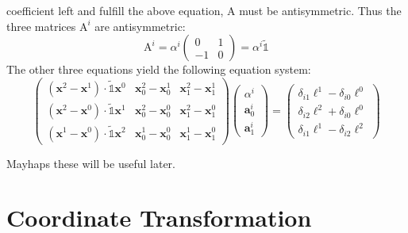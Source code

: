 \documentclass{scrartcl}
\begin{document}
coefficient left and fulfill the above equation, $\mathrm A$ must be
antisymmetric.  Thus the three matrices $\mathrm A^i$ are antisymmetric:
\begin{equation}
  \mathrm A^i=\alpha^i\begin{pmatrix}0&1\\-1&0\end{pmatrix}
  =\alpha^i\mathds{\tilde1}
\end{equation}
The other three equations yield the following equation system:
\begin{equation}
  \begin{pmatrix}
    (\mathbf x^2-\mathbf x^1)\cdot\mathds{\tilde1}\mathbf x^0
            & \mathbf x^2_0-\mathbf x^1_0
                      & \mathbf x^2_1-\mathbf x^1_1  \\
    (\mathbf x^2-\mathbf x^0)\cdot\mathds{\tilde1}\mathbf x^1
            & \mathbf x^2_0-\mathbf x^0_0
                      & \mathbf x^2_1-\mathbf x^0_1  \\
    (\mathbf x^1-\mathbf x^0)\cdot\mathds{\tilde1}\mathbf x^2
            & \mathbf x^1_0-\mathbf x^0_0
                      & \mathbf x^1_1-\mathbf x^0_1
  \end{pmatrix}
  \begin{pmatrix}
    \alpha^i      \\
    \mathbf a^i_0 \\
    \mathbf a^i_1
  \end{pmatrix}
  =
  \begin{pmatrix}
    \delta_{i1}\ell^1-\delta_{i0}\ell^0 \\
    \delta_{i2}\ell^2+\delta_{i0}\ell^0 \\
    \delta_{i1}\ell^1-\delta_{i2}\ell^2
  \end{pmatrix}
\end{equation}

Mayhaps these will be useful later.

\section{Coordinate Transformation}
\end{document}
